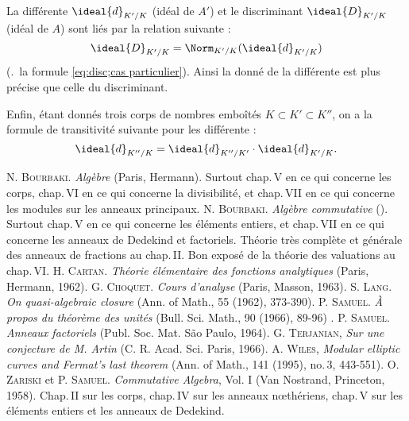 \documentclass[11pt, %
  title in boldface,
  theorem in new line,
  theorem numbering = section,
  number theorems separately,
  simple name,
]{beaulivre}
\begin{document}
    La différente \( \ideal{d}_{K'/K} \) (idéal de \( A' \)) et le discriminant \( \ideal{D}_{K'/K} \) (idéal de \( A \)) sont liés par la relation suivante :
    \begin{equation}
        \ideal{D}_{K'/K} = \Norm_{K'/K}(\ideal{d}_{K'/K})
    \end{equation}
    (\cf.~la formule \eqref{eq:disc;cas particulier}). Ainsi la donné de la différente est plus précise que celle du discriminant.

    Enfin, étant donnés trois corps de nombres emboîtés \( K \subset K' \subset K'' \), on a la formule de transitivité suivante pour les différente :
    \begin{equation}
        \ideal{d}_{K''/K} = \ideal{d}_{K''/K'} \cdot \ideal{d}_{K'/K}.
    \end{equation}


\backmatter

{}
\begin{thebibliography}{}
    \thispagestyle{plain}
     \textsc{N. Bourbaki}. \textit{Algèbre} (Paris, Hermann). Surtout chap.\,V en ce qui concerne les corps, chap.\,VI en ce qui concerne la divisibilité, et chap.\,VII en ce qui concerne les modules sur les anneaux principaux.
     \textsc{N. Bourbaki}. \textit{Algèbre commutative} (\ibid). Surtout chap.\,V en ce qui concerne les éléments entiers, et chap.\,VII en ce qui concerne les anneaux de Dedekind et factoriels. Théorie très complète et générale des anneaux de fractions au chap.\,II. Bon exposé de la théorie des valuations au chap.\,VI.
     \textsc{H. Cartan}. \textit{Théorie élémentaire des fonctions analytiques} (Paris, Hermann, 1962).
     \textsc{G. Choquet}. \textit{Cours d'analyse} (Paris, Masson, 1963).
     \textsc{S. Lang}. \textit{On quasi-algebraic closure} (Ann. of Math., 55 (1962), 373-390).
     \textsc{P. Samuel}. \textit{À propos du théorème des unités} (Bull. Sci. Math., 90 (1966), 89-96) .
     \textsc{P. Samuel}. \textit{Anneaux factoriels} (Publ. Soc. Mat. São Paulo, 1964).
     \textsc{G. Terjanian}, \textit{Sur une conjecture de M. Artin} (C. R. Acad. Sci. Paris, 1966).
     \textsc{A. Wiles}, \textit{Modular elliptic curves and Fermat's last theorem} (Ann. of Math., 141 (1995), no.\,3, 443-551).
     \textsc{O. Zariski} et \textsc{P. Samuel}. \textit{Commutative Algebra}, Vol. I (Van Nostrand, Princeton, 1958). Chap.\,II sur les corps, chap.\,IV sur les anneaux nœthériens, chap.\,V sur les éléments entiers et les anneaux de Dedekind.
\end{thebibliography}
\end{document}
